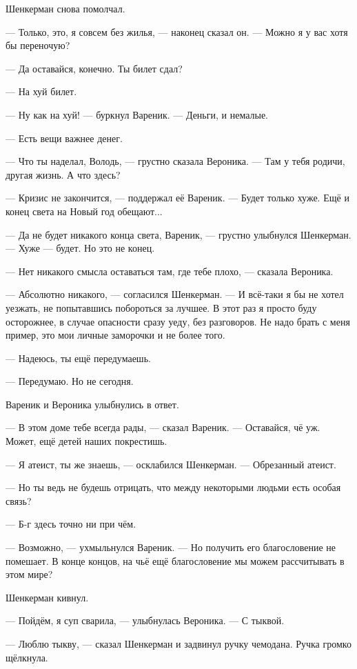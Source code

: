 Шенкерман снова помолчал.

--- Только, это, я совсем без жилья, --- наконец сказал он.
--- Можно я у вас хотя бы переночую?

--- Да оставайся, конечно.
Ты билет сдал?

--- На хуй билет.

--- Ну как на хуй! --- буркнул Вареник.
--- Деньги, и немалые.

--- Есть вещи важнее денег.

--- Что ты наделал, Володь, --- грустно сказала Вероника.
--- Там у тебя родичи, другая жизнь.
А что здесь?

--- Кризис не закончится, --- поддержал её Вареник.
--- Будет только хуже.
Ещё и конец света на Новый год обещают...

--- Да не будет никакого конца света, Вареник, --- грустно улыбнулся Шенкерман.
--- Хуже --- будет.
Но это не конец.

--- Нет никакого смысла оставаться там, где тебе плохо, --- сказала Вероника.

--- Абсолютно никакого, --- согласился Шенкерман.
--- И всё-таки я бы не хотел уезжать, не попытавшись побороться за лучшее.
В этот раз я просто буду осторожнее, в случае опасности сразу уеду, без разговоров.
Не надо брать с меня пример, это мои личные заморочки и не более того.

--- Надеюсь, ты ещё передумаешь.

--- Передумаю.
Но не сегодня.

Вареник и Вероника улыбнулись в ответ.

--- В этом доме тебе всегда рады, --- сказал Вареник.
--- Оставайся, чё уж.
Может, ещё детей наших покрестишь.

--- Я атеист, ты же знаешь, --- осклабился Шенкерман.
--- Обрезанный атеист.

--- Но ты ведь не будешь отрицать, что между некоторыми людьми есть особая связь?

--- Б-г здесь точно ни при чём.

--- Возможно, --- ухмыльнулся Вареник.
--- Но получить его благословение не помешает.
В конце концов, на чьё ещё благословение мы можем рассчитывать в этом мире?

Шенкерман кивнул.

--- Пойдём, я суп сварила, --- улыбнулась Вероника.
--- С тыквой.

--- Люблю тыкву, --- сказал Шенкерман и задвинул ручку чемодана.
Ручка громко щёлкнула.

